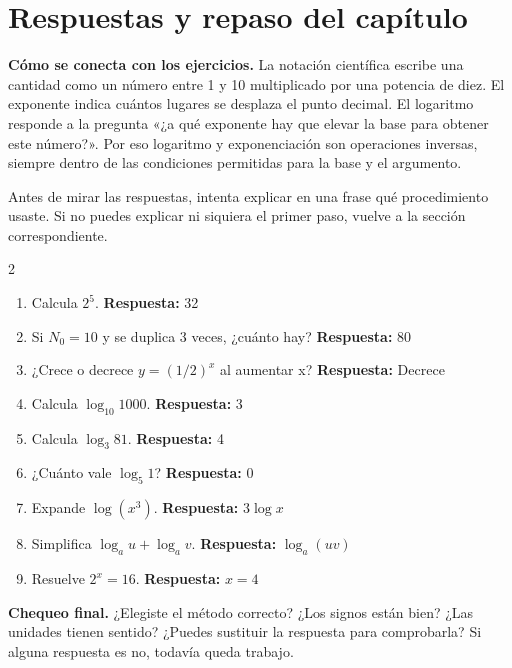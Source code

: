 \documentclass[10pt,oneside,openany]{book}
\begin{document}
\section{Respuestas y repaso del capítulo}

\textbf{Cómo se conecta con los ejercicios.} La notación científica escribe una cantidad como un número entre 1 y 10 multiplicado por una potencia de diez. El exponente indica cuántos lugares se desplaza el punto decimal. El logaritmo responde a la pregunta «¿a qué exponente hay que elevar la base para obtener este número?». Por eso logaritmo y exponenciación son operaciones inversas, siempre dentro de las condiciones permitidas para la base y el argumento.

Antes de mirar las respuestas, intenta explicar en una frase qué procedimiento usaste. Si no puedes explicar ni siquiera el primer paso, vuelve a la sección correspondiente.

\begin{multicols}{2}\begin{enumerate}

\item Calcula $2^5$. \textbf{Respuesta:} 32

\item Si $N_0=10$ y se duplica 3 veces, ¿cuánto hay? \textbf{Respuesta:} 80

\item ¿Crece o decrece $y=(1/2)^x$ al aumentar x? \textbf{Respuesta:} Decrece

\item Calcula $\log_{10}1000$. \textbf{Respuesta:} 3

\item Calcula $\log_3 81$. \textbf{Respuesta:} 4

\item ¿Cuánto vale $\log_5 1$? \textbf{Respuesta:} 0

\item Expande $\log(x^3)$. \textbf{Respuesta:} $3\log x$

\item Simplifica $\log_a u+\log_a v$. \textbf{Respuesta:} $\log_a(uv)$

\item Resuelve $2^x=16$. \textbf{Respuesta:} $x=4$

\end{enumerate}\end{multicols}

\begin{idea}\textbf{Chequeo final.} ¿Elegiste el método correcto? ¿Los signos están bien? ¿Las unidades tienen sentido? ¿Puedes sustituir la respuesta para comprobarla? Si alguna respuesta es no, todavía queda trabajo.\end{idea}
\end{document}
